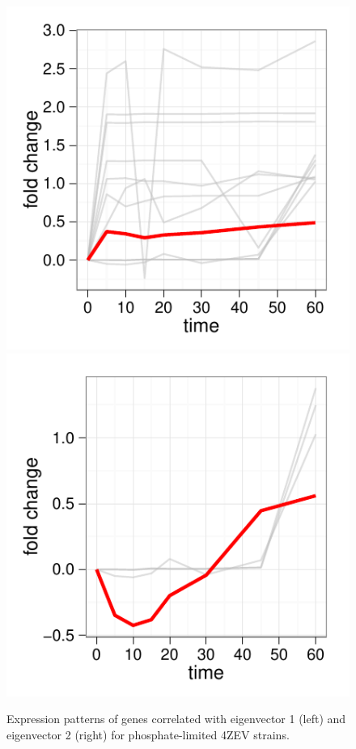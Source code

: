 \documentclass[letter]{article}\usepackage{graphicx, color}
\makeatletter
\def\maxwidth{ %
  \ifdim\Gin@nat@width>\linewidth
    \linewidth
  \else
    \Gin@nat@width
  \fi
}
\newenvironment{knitrout}{}{} %
\makeatother
\begin{document}
\begin{figure}
\begin{knitrout}
\color{fgcolor}\includegraphics[width=\maxwidth]{figure/w1} \includegraphics[width=\maxwidth]{figure/w2} 
\end{knitrout}

\caption{Expression patterns of genes correlated with eigenvector 1 (left) and eigenvector 2 (right) for phosphate-limited 4ZEV strains.}
\end{figure}
\end{document}
